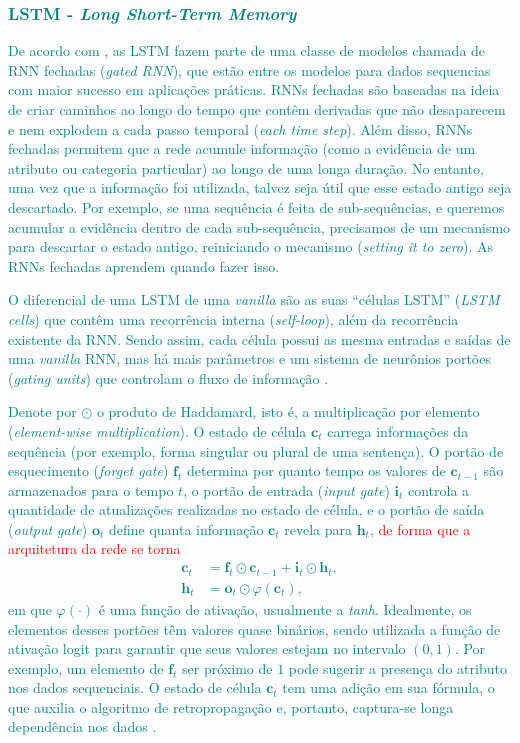 \documentclass{automatextcc}
\newcommand{\nico}[1]{\textcolor{teal}{#1}}
\newcommand{\pumi}[1]{\textcolor{red}{#1}}
\newcommand{\bs}[1]{\boldsymbol{#1}}
\begin{document}
\subsubsection{\nico{LSTM - \textit{Long Short-Term Memory}}}

\nico{
De acordo com \citet{goodfellow2016}, as LSTM fazem parte de uma classe de modelos chamada de RNN fechadas (\textit{gated RNN}), que estão entre os modelos para dados sequencias com maior sucesso em aplicações práticas. RNNs fechadas são baseadas na ideia de criar caminhos ao longo do tempo que contêm derivadas que não desaparecem e nem explodem a cada passo temporal (\textit{each time step}). Além disso, RNNs fechadas permitem que a rede acumule informação (como a evidência de um atributo ou categoria particular) ao longo de uma longa duração. No entanto, uma vez que a informação foi utilizada, talvez seja útil que esse estado antigo seja descartado. Por exemplo, se uma sequência é feita de sub-sequências, e queremos acumular a evidência dentro de cada sub-sequência, precisamos de um mecanismo para descartar o estado antigo, reiniciando o mecanismo (\textit{setting it to zero}). As RNNs fechadas aprendem quando fazer isso.
}

\nico{
O diferencial de uma  LSTM de uma \textit{vanilla} são as suas ``células LSTM'' (\textit{LSTM cells}) que contêm uma recorrência interna (\textit{self-loop}), além da recorrência existente da RNN. Sendo assim, cada célula possui as mesma entradas e saídas de uma \textit{vanilla} RNN, mas há mais parâmetros e um sistema de neurônios portões (\textit{gating units}) que controlam o fluxo de informação \citep{goodfellow2016}.
}

\nico{
Denote por $\odot$ o produto de Haddamard, isto é, a multiplicação por elemento (\textit{element-wise multiplication}). O estado de célula $\bs{c}_t$ carrega informações da sequência (por exemplo, forma singular ou plural de uma sentença). O portão de esquecimento (\textit{forget gate}) $\bs{f}_t$ determina por quanto tempo os valores de $\bs{c}_{t-1}$ são armazenados para o tempo $t$, o portão de entrada (\textit{input gate}) $\bs{i}_t$ controla a quantidade de atualizações realizadas no estado de célula, e o portão de saída (\textit{output gate}) $\bs{o}_t$ define quanta informação $\bs{c}_t$ revela para $\bs{h}_t$, \pumi{de forma que a arquitetura da rede se torna} 
\begin{align*}
    \bs{c}_{t} & = \bs{f}_{t} \odot \bs{c}_{t-1} + \bs{i}_{t} \odot \bs{h}_{t},  \\
    \bs{h}_{t} & = \bs{o}_{t} \odot \varphi(\bs{c}_{t}),
\end{align*}
em que $\varphi(\cdot)$ é uma função de ativação, usualmente a \textit{tanh}. Idealmente, os elementos desses portões têm valores quase binários, sendo utilizada a função de ativação logit para garantir que seus valores estejam no intervalo $(0,1)$. Por exemplo, um elemento de $\bs{f}_t$ ser próximo de $1$ pode sugerir a presença do atributo nos dados sequenciais. O estado de célula $\bs{c}_t$ tem uma adição em sua fórmula, o que auxilia o algoritmo de retropropagação e, portanto, captura-se longa dependência nos dados \citep{goodfellow2016, fan2021}.
}
\end{document}
